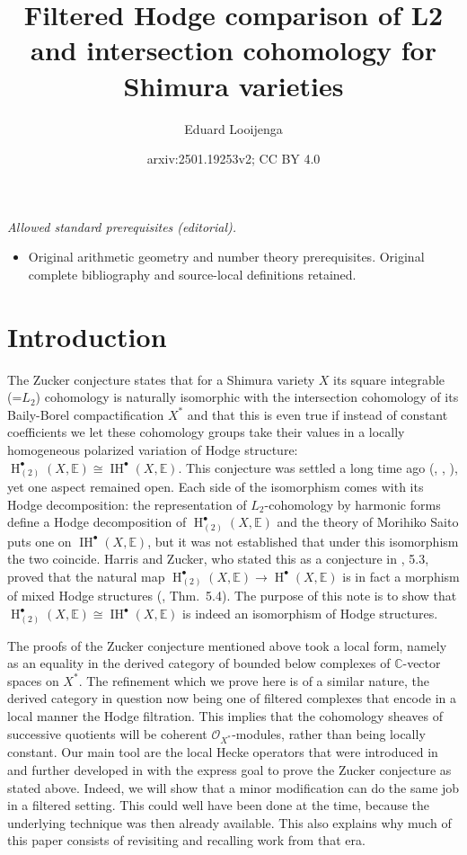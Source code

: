 \documentclass[12pt,letterpaper]{amsart}
\title{Filtered Hodge comparison of L2 and intersection cohomology for Shimura varieties}
\author{Eduard Looijenga}
\date{arxiv:2501.19253v2; CC BY 4.0}
\numberwithin{equation}{section}
\def\CC{{\mathbb C}}
\def\EE{{\mathbb E}}
\def\Ocal{{\mathcal O}}
\def\pt{{\scriptscriptstyle\bullet}}
\newcommand\Hl{\operatorname{H}}
\newcommand\IH{\operatorname{IH}}
\theoremstyle{remark}
\begin{document}
\maketitle
\noindent\textit{Allowed standard prerequisites (editorial).}\begin{itemize}
\item Original arithmetic geometry and number theory prerequisites. Original complete bibliography and source-local definitions retained.
\end{itemize}\medskip
\section*{Introduction}
The Zucker conjecture states that for a Shimura variety $X$ its square integrable (=$L_2$) cohomology is naturally isomorphic with 
the intersection cohomology of its Baily-Borel compactification $X^*$ and that this is even  true if instead of constant coefficients 
we let these cohomology groups take their values in a  locally homogeneous polarized variation of Hodge structure: $\Hl^\pt_{(2)}(X,\EE)\cong \IH^\pt(X,\EE)$.
This conjecture was settled a long time ago (\cite{looij:l2}, \cite{ss}, \cite{lr}), yet one aspect remained open. 
Each side of the isomorphism comes with its Hodge decomposition: the representation of $L_2$-cohomology 
by harmonic  forms define a Hodge decomposition of $\Hl^\pt_{(2)}(X,\EE)$ and the theory of Morihiko Saito 
\cite{saito:hmodules} puts one on $\IH^\pt(X,\EE)$, but it was not established that under this isomorphism  
the two coincide.  Harris and Zucker, who  stated this as a conjecture in \cite{hz}, 5.3,  proved  that the natural map  
$\Hl^\pt_{(2)}(X,\EE)\to \Hl^\pt(X, \EE)$ is in fact a 
morphism of mixed Hodge structures (\cite{hz}, Thm.\ 5.4). The purpose of this note is to show that 
$\Hl^\pt_{(2)}(X,\EE)\cong \IH^\pt(X,\EE)$ is  indeed an isomorphism of Hodge structures.
 
The proofs of the Zucker conjecture  mentioned above took  a local form, namely as an equality in the derived category 
of bounded below complexes of $\CC$-vector spaces on $X^*$. The refinement which we prove  here  is of a similar 
nature, the derived category in question now being  one of filtered complexes that encode in a local manner the 
Hodge filtration. This implies that  the cohomology sheaves of successive quotients will be coherent $\Ocal_{X^*}$-modules, rather than being  locally constant. Our main tool are  the local Hecke operators that were  introduced in  
\cite{looij:l2} and further developed in \cite{lr} with the express goal to prove the Zucker conjecture as stated above. 
Indeed, we will show   that  a minor modification  can do the same job in a filtered setting.  
This could well have been done at the time, because the underlying technique was then already available.
This also explains why much of this paper consists of revisiting and recalling work from that  era.
\end{document}
